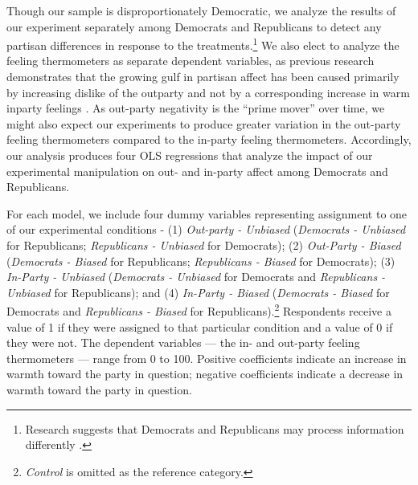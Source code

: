 \documentclass[12pt, letterpaper]{article}
\begin{document}
{Though our sample is disproportionately Democratic, we analyze the results of our experiment separately among Democrats and Republicans to detect any partisan differences in response to the treatments.\footnote{Research suggests that Democrats and Republicans may process information differently \citep{grossmanhopkins_2016}.} We also elect to analyze the feeling thermometers as separate dependent variables, as previous research demonstrates that the growing gulf in partisan affect has been caused primarily by increasing dislike of the outparty and not by a corresponding increase in warm inparty feelings \citep{haidthetherington_2012, IyengarSoodLelkes2012}. As out-party negativity is the ``prime mover'' over time, we might also expect our experiments to produce greater variation in the out-party feeling thermometers compared to the in-party feeling thermometers. Accordingly, our analysis produces four OLS regressions that analyze the impact of our experimental manipulation on out- and in-party affect among Democrats and Republicans. 

For each model, we include four dummy variables representing assignment to one of our experimental conditions - (1) \textit{Out-party - Unbiased} (\textit{Democrats - Unbiased} for Republicans; \textit{Republicans - Unbiased} for Democrats); (2) \textit{Out-Party - Biased} (\textit{Democrats - Biased} for Republicans; \textit{Republicans - Biased} for Democrats); (3) \textit{In-Party - Unbiased} (\textit{Democrats - Unbiased} for Democrats and \textit{Republicans - Unbiased} for Republicans); and (4) \textit{In-Party - Biased} (\textit{Democrats - Biased} for Democrats and \textit{Republicans - Biased} for Republicans).\footnote{\textit{Control} is omitted as the reference category.} Respondents receive a value of 1 if they were assigned to that particular condition and a value of 0 if they were not. The dependent variables --- the in- and out-party feeling thermometers --- range from 0 to 100. Positive coefficients indicate an increase in warmth toward the party in question; negative coefficients indicate a decrease in warmth toward the party in question.

}
\end{document}

